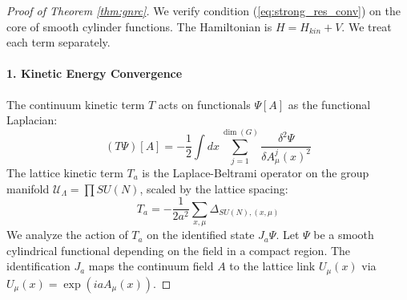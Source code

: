 \begin{proof}[Proof of Theorem \ref{thm:gnrc}]
We verify condition (\ref{eq:strong_res_conv}) on the core of smooth cylinder functions.
The Hamiltonian is $H = H_{kin} + V$. We treat each term separately.

\paragraph{1. Kinetic Energy Convergence}
The continuum kinetic term $T$ acts on functionals $\Psi[A]$ as the functional Laplacian:
\begin{equation}
(T \Psi)[A] = -\frac{1}{2} \int dx \sum_{j=1}^{\dim(G)} \frac{\delta^2 \Psi}{\delta A_\mu^j(x)^2}
\end{equation}
The lattice kinetic term $T_a$ is the Laplace-Beltrami operator on the group manifold $\mathcal{U}_{\Lambda} = \prod SU(N)$, scaled by the lattice spacing:
\begin{equation}
T_a = -\frac{1}{2a^2} \sum_{x, \mu} \Delta_{SU(N), (x,\mu)}
\end{equation}
We analyze the action of $T_a$ on the identified state $J_a \Psi$. Let $\Psi$ be a smooth cylindrical functional depending on the field in a compact region. The identification $J_a$ maps the continuum field $A$ to the lattice link $U_\mu(x)$ via $U_\mu(x) = \exp(i a A_\mu(x))$.


\end{proof}
